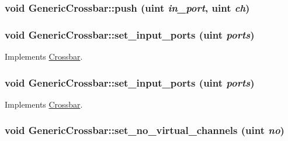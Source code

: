 \hypertarget{classGenericCrossbar_d925d4a2c3b5b4585e087dc423eeb0b8}{
\subsubsection[{push}]{\setlength{\rightskip}{0pt plus 5cm}void GenericCrossbar::push ({\bf uint} {\em in\_\-port}, \/  {\bf uint} {\em ch})}}
\label{classGenericCrossbar_d925d4a2c3b5b4585e087dc423eeb0b8}


\hypertarget{classGenericCrossbar_c97249405a9bc78f2c1c9c28ad660472}{
\subsubsection[{set\_\-input\_\-ports}]{\setlength{\rightskip}{0pt plus 5cm}void GenericCrossbar::set\_\-input\_\-ports ({\bf uint} {\em ports})}}
\label{classGenericCrossbar_c97249405a9bc78f2c1c9c28ad660472}




Implements \hyperlink{classCrossbar_3223fa48d2c281d62747e4c10a14e1ba}{Crossbar}.\hypertarget{classGenericCrossbar_c97249405a9bc78f2c1c9c28ad660472}{
\subsubsection[{set\_\-input\_\-ports}]{\setlength{\rightskip}{0pt plus 5cm}void GenericCrossbar::set\_\-input\_\-ports ({\bf uint} {\em ports})}}
\label{classGenericCrossbar_c97249405a9bc78f2c1c9c28ad660472}




Implements \hyperlink{classCrossbar_3223fa48d2c281d62747e4c10a14e1ba}{Crossbar}.\hypertarget{classGenericCrossbar_e9d67e36be87ea3169baa80ae52044e3}{
\subsubsection[{set\_\-no\_\-virtual\_\-channels}]{\setlength{\rightskip}{0pt plus 5cm}void GenericCrossbar::set\_\-no\_\-virtual\_\-channels ({\bf uint} {\em no})}}
\label{classGenericCrossbar_e9d67e36be87ea3169baa80ae52044e3}




